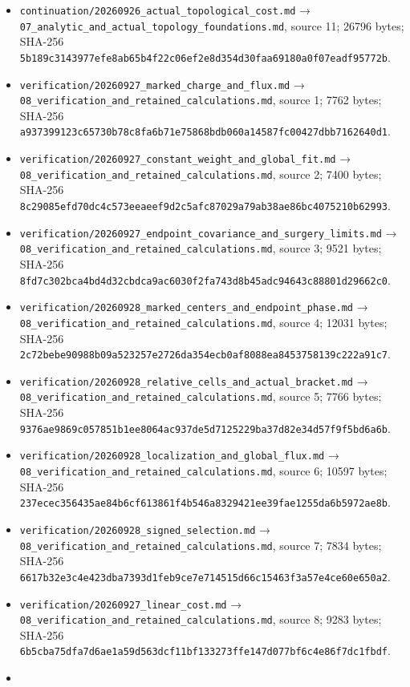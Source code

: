 \documentclass[
  10pt,
]{article}
\begin{document}
\begin{itemize}
\item
  \nolinkurl{continuation/20260926_actual_topological_cost.md} →
  \nolinkurl{07_analytic_and_actual_topology_foundations.md}, source
  11; 26796 bytes; SHA-256
  \nolinkurl{5b189c3143977efe8ab65b4f22c06ef2e8d354d30faa69180a0f07eadf95772b}.
\item
  \nolinkurl{verification/20260927_marked_charge_and_flux.md} →
  \nolinkurl{08_verification_and_retained_calculations.md}, source 1;
  7762 bytes; SHA-256
  \nolinkurl{a937399123c65730b78c8fa6b71e75868bdb060a14587fc00427dbb7162640d1}.
\item
  \nolinkurl{verification/20260927_constant_weight_and_global_fit.md}
  → \nolinkurl{08_verification_and_retained_calculations.md}, source 2;
  7400 bytes; SHA-256
  \nolinkurl{8c29085efd70dc4c573eeaeef9d2c5afc87029a79ab38ae86bc4075210b62993}.
\item
  \nolinkurl{verification/20260927_endpoint_covariance_and_surgery_limits.md}
  → \nolinkurl{08_verification_and_retained_calculations.md}, source 3;
  9521 bytes; SHA-256
  \nolinkurl{8fd7c302bca4bd4d32cbdca9ac6030f2fa743d8b45adc94643c88801d29662c0}.
\item
  \nolinkurl{verification/20260928_marked_centers_and_endpoint_phase.md}
  → \nolinkurl{08_verification_and_retained_calculations.md}, source 4;
  12031 bytes; SHA-256
  \nolinkurl{2c72bebe90988b09a523257e2726da354ecb0af8088ea8453758139c222a91c7}.
\item
  \nolinkurl{verification/20260928_relative_cells_and_actual_bracket.md}
  → \nolinkurl{08_verification_and_retained_calculations.md}, source 5;
  7766 bytes; SHA-256
  \nolinkurl{9376ae9869c057851b1ee8064ac937de5d7125229ba37d82e34d57f9f5bd6a6b}.
\item
  \nolinkurl{verification/20260928_localization_and_global_flux.md} →
  \nolinkurl{08_verification_and_retained_calculations.md}, source 6;
  10597 bytes; SHA-256
  \nolinkurl{237ecec356435ae84b6cf613861f4b546a8329421ee39fae1255da6b5972ae8b}.
\item
  \nolinkurl{verification/20260928_signed_selection.md} →
  \nolinkurl{08_verification_and_retained_calculations.md}, source 7;
  7834 bytes; SHA-256
  \nolinkurl{6617b32e3c4e423dba7393d1feb9ce7e714515d66c15463f3a57e4ce60e650a2}.
\item
  \nolinkurl{verification/20260927_linear_cost.md} →
  \nolinkurl{08_verification_and_retained_calculations.md}, source 8;
  9283 bytes; SHA-256
  \nolinkurl{6b5cba75dfa7d6ae1a59d563dcf11bf133273ffe147d077bf6c4e86f7dc1fbdf}.
\item

\end{itemize}
\end{document}
